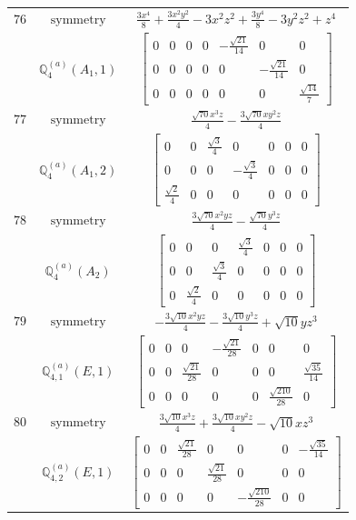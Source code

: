 \documentclass[fleqn,8pt,landscape]{jsarticle}
\begin{document}
\begin{longtable}{ccc}
$ 76 $ & $ \text{symmetry} $ & $ \frac{3 x^{4}}{8} + \frac{3 x^{2} y^{2}}{4} - 3 x^{2} z^{2} + \frac{3 y^{4}}{8} - 3 y^{2} z^{2} + z^{4} $ \\
$  $ & $ \mathbb{Q}_{4}^{(a)}(A_{1},1) $ & $ \begin{bmatrix} 0 & 0 & 0 & 0 & - \frac{\sqrt{21}}{14} & 0 & 0 \\ 0 & 0 & 0 & 0 & 0 & - \frac{\sqrt{21}}{14} & 0 \\ 0 & 0 & 0 & 0 & 0 & 0 & \frac{\sqrt{14}}{7} \end{bmatrix} $ \\ \hline
$ 77 $ & $ \text{symmetry} $ & $ \frac{\sqrt{70} x^{3} z}{4} - \frac{3 \sqrt{70} x y^{2} z}{4} $ \\
$  $ & $ \mathbb{Q}_{4}^{(a)}(A_{1},2) $ & $ \begin{bmatrix} 0 & 0 & \frac{\sqrt{3}}{4} & 0 & 0 & 0 & 0 \\ 0 & 0 & 0 & - \frac{\sqrt{3}}{4} & 0 & 0 & 0 \\ \frac{\sqrt{2}}{4} & 0 & 0 & 0 & 0 & 0 & 0 \end{bmatrix} $ \\ \hline
$ 78 $ & $ \text{symmetry} $ & $ \frac{3 \sqrt{70} x^{2} y z}{4} - \frac{\sqrt{70} y^{3} z}{4} $ \\
$  $ & $ \mathbb{Q}_{4}^{(a)}(A_{2}) $ & $ \begin{bmatrix} 0 & 0 & 0 & \frac{\sqrt{3}}{4} & 0 & 0 & 0 \\ 0 & 0 & \frac{\sqrt{3}}{4} & 0 & 0 & 0 & 0 \\ 0 & \frac{\sqrt{2}}{4} & 0 & 0 & 0 & 0 & 0 \end{bmatrix} $ \\ \hline
$ 79 $ & $ \text{symmetry} $ & $ - \frac{3 \sqrt{10} x^{2} y z}{4} - \frac{3 \sqrt{10} y^{3} z}{4} + \sqrt{10} y z^{3} $ \\
$  $ & $ \mathbb{Q}_{4,1}^{(a)}(E,1) $ & $ \begin{bmatrix} 0 & 0 & 0 & - \frac{\sqrt{21}}{28} & 0 & 0 & 0 \\ 0 & 0 & \frac{\sqrt{21}}{28} & 0 & 0 & 0 & \frac{\sqrt{35}}{14} \\ 0 & 0 & 0 & 0 & 0 & \frac{\sqrt{210}}{28} & 0 \end{bmatrix} $ \\ \hline
$ 80 $ & $ \text{symmetry} $ & $ \frac{3 \sqrt{10} x^{3} z}{4} + \frac{3 \sqrt{10} x y^{2} z}{4} - \sqrt{10} x z^{3} $ \\
$  $ & $ \mathbb{Q}_{4,2}^{(a)}(E,1) $ & $ \begin{bmatrix} 0 & 0 & \frac{\sqrt{21}}{28} & 0 & 0 & 0 & - \frac{\sqrt{35}}{14} \\ 0 & 0 & 0 & \frac{\sqrt{21}}{28} & 0 & 0 & 0 \\ 0 & 0 & 0 & 0 & - \frac{\sqrt{210}}{28} & 0 & 0 \end{bmatrix} $ \\ \hline

\end{longtable}
\end{document}
